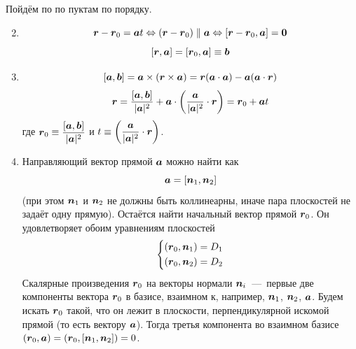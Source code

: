 \documentclass[a4paper,12pt]{article}
\begin{document}
  \begin{solution}
    Пойдём по по пуктам по порядку.
    
    \begin{enumerate}
      \setcounter{enumi}{1}
      
      \item
        \[
          \boldsymbol r - \boldsymbol r_0 = \boldsymbol a t
          \Leftrightarrow (\boldsymbol r - \boldsymbol r_0) \parallel \boldsymbol a
          \Leftrightarrow [\boldsymbol r - \boldsymbol r_0, \boldsymbol a] = \boldsymbol 0
        \]
        \[
          [\boldsymbol r, \boldsymbol a] = [\boldsymbol r_0, \boldsymbol a] \equiv \boldsymbol b
        \]
      
      \item
        \[
          [\boldsymbol a, \boldsymbol b] = \boldsymbol a \times (\boldsymbol r \times \boldsymbol a) = \boldsymbol r (\boldsymbol a \cdot \boldsymbol a) - \boldsymbol a (\boldsymbol a \cdot \boldsymbol r)
        \]
        \[
          \boldsymbol r = \frac{[\boldsymbol a, \boldsymbol b]}{|\boldsymbol a|^2} + \boldsymbol a \cdot \left(\frac{\boldsymbol a}{|\boldsymbol a|^2} \cdot \boldsymbol r\right)
          = \boldsymbol r_0 + \boldsymbol a t
        \]
        где $\bds r_0 \hm\equiv \dfrac{[\bds a, \bds b]}{|\bds a|^2}$ и $t \hm\equiv \left(\dfrac{\bds a}{|\bds a|^2} \cdot \bds r\right)$.
      
      \setcounter{enumi}{4}
      
      \item
        Направляющий вектор прямой $\boldsymbol a$ можно найти как
        \[
          \boldsymbol a = [\boldsymbol n_1, \boldsymbol n_2]
        \]
        (при этом $\boldsymbol n_1$ и $\boldsymbol n_2$ не должны быть коллинеарны, иначе пара плоскостей не задаёт одну прямую).
        Остаётся найти начальный вектор прямой $\boldsymbol r_0$.
        Он удовлетворяет обоим уравнениям плоскостей
        \[
          \left\{
          \begin{aligned}
            &(\boldsymbol r_0, \boldsymbol n_1) = D_1\\
            &(\boldsymbol r_0, \boldsymbol n_2) = D_2
          \end{aligned}
          \right.
        \]
        Скалярные произведения $\boldsymbol r_0$ на векторы нормали $\boldsymbol n_i$~---~первые две компоненты вектора $\boldsymbol r_0$ в базисе, взаимном к, например, $\boldsymbol n_1$, $\boldsymbol n_2$, $\boldsymbol a$.
        Будем искать $\boldsymbol r_0$ такой, что он лежит в плоскости, перпендикулярной искомой прямой (то есть вектору $\boldsymbol a$).
        Тогда третья компонента во взаимном базисе $(\bds r_0, \bds a) \hm= (\bds r_0, [\bds n_1, \bds n_2]) \hm= 0$.
        

\end{enumerate}
\end{solution}
\end{document}
